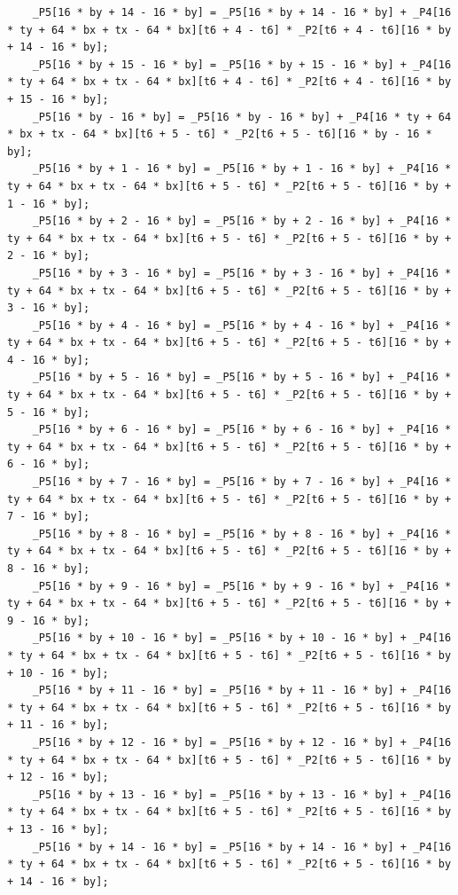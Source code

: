 \documentclass[msthesis,justified,copyright,final,numbers,sort&compress,
gsmodern,amstex,natbib]{uothesis}
\begin{document}
\begin{lstlisting}
    _P5[16 * by + 14 - 16 * by] = _P5[16 * by + 14 - 16 * by] + _P4[16 * ty + 64 * bx + tx - 64 * bx][t6 + 4 - t6] * _P2[t6 + 4 - t6][16 * by + 14 - 16 * by];
    _P5[16 * by + 15 - 16 * by] = _P5[16 * by + 15 - 16 * by] + _P4[16 * ty + 64 * bx + tx - 64 * bx][t6 + 4 - t6] * _P2[t6 + 4 - t6][16 * by + 15 - 16 * by];
    _P5[16 * by - 16 * by] = _P5[16 * by - 16 * by] + _P4[16 * ty + 64 * bx + tx - 64 * bx][t6 + 5 - t6] * _P2[t6 + 5 - t6][16 * by - 16 * by];
    _P5[16 * by + 1 - 16 * by] = _P5[16 * by + 1 - 16 * by] + _P4[16 * ty + 64 * bx + tx - 64 * bx][t6 + 5 - t6] * _P2[t6 + 5 - t6][16 * by + 1 - 16 * by];
    _P5[16 * by + 2 - 16 * by] = _P5[16 * by + 2 - 16 * by] + _P4[16 * ty + 64 * bx + tx - 64 * bx][t6 + 5 - t6] * _P2[t6 + 5 - t6][16 * by + 2 - 16 * by];
    _P5[16 * by + 3 - 16 * by] = _P5[16 * by + 3 - 16 * by] + _P4[16 * ty + 64 * bx + tx - 64 * bx][t6 + 5 - t6] * _P2[t6 + 5 - t6][16 * by + 3 - 16 * by];
    _P5[16 * by + 4 - 16 * by] = _P5[16 * by + 4 - 16 * by] + _P4[16 * ty + 64 * bx + tx - 64 * bx][t6 + 5 - t6] * _P2[t6 + 5 - t6][16 * by + 4 - 16 * by];
    _P5[16 * by + 5 - 16 * by] = _P5[16 * by + 5 - 16 * by] + _P4[16 * ty + 64 * bx + tx - 64 * bx][t6 + 5 - t6] * _P2[t6 + 5 - t6][16 * by + 5 - 16 * by];
    _P5[16 * by + 6 - 16 * by] = _P5[16 * by + 6 - 16 * by] + _P4[16 * ty + 64 * bx + tx - 64 * bx][t6 + 5 - t6] * _P2[t6 + 5 - t6][16 * by + 6 - 16 * by];
    _P5[16 * by + 7 - 16 * by] = _P5[16 * by + 7 - 16 * by] + _P4[16 * ty + 64 * bx + tx - 64 * bx][t6 + 5 - t6] * _P2[t6 + 5 - t6][16 * by + 7 - 16 * by];
    _P5[16 * by + 8 - 16 * by] = _P5[16 * by + 8 - 16 * by] + _P4[16 * ty + 64 * bx + tx - 64 * bx][t6 + 5 - t6] * _P2[t6 + 5 - t6][16 * by + 8 - 16 * by];
    _P5[16 * by + 9 - 16 * by] = _P5[16 * by + 9 - 16 * by] + _P4[16 * ty + 64 * bx + tx - 64 * bx][t6 + 5 - t6] * _P2[t6 + 5 - t6][16 * by + 9 - 16 * by];
    _P5[16 * by + 10 - 16 * by] = _P5[16 * by + 10 - 16 * by] + _P4[16 * ty + 64 * bx + tx - 64 * bx][t6 + 5 - t6] * _P2[t6 + 5 - t6][16 * by + 10 - 16 * by];
    _P5[16 * by + 11 - 16 * by] = _P5[16 * by + 11 - 16 * by] + _P4[16 * ty + 64 * bx + tx - 64 * bx][t6 + 5 - t6] * _P2[t6 + 5 - t6][16 * by + 11 - 16 * by];
    _P5[16 * by + 12 - 16 * by] = _P5[16 * by + 12 - 16 * by] + _P4[16 * ty + 64 * bx + tx - 64 * bx][t6 + 5 - t6] * _P2[t6 + 5 - t6][16 * by + 12 - 16 * by];
    _P5[16 * by + 13 - 16 * by] = _P5[16 * by + 13 - 16 * by] + _P4[16 * ty + 64 * bx + tx - 64 * bx][t6 + 5 - t6] * _P2[t6 + 5 - t6][16 * by + 13 - 16 * by];
    _P5[16 * by + 14 - 16 * by] = _P5[16 * by + 14 - 16 * by] + _P4[16 * ty + 64 * bx + tx - 64 * bx][t6 + 5 - t6] * _P2[t6 + 5 - t6][16 * by + 14 - 16 * by];

\end{lstlisting}
\end{document}
